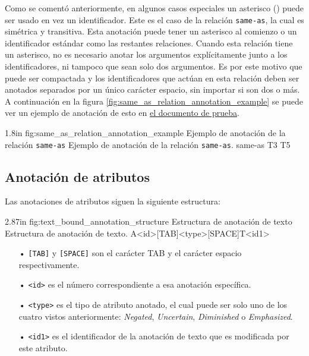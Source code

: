 Como se comentó anteriormente, en algunos casos especiales un asterisco (\doublequote{\,*\,}) puede ser usado en vez un identificador. Este es el caso de la relación \texttt{same-as}, la cual es simétrica y transitiva. Esta anotación puede tener un asterisco al comienzo o un identificador estándar como las restantes relaciones. Cuando esta relación tiene un asterisco, no es necesario anotar los argumentos explícitamente junto a los identificadores, ni tampoco que sean solo dos argumentos. Es por este motivo que puede ser compactada y los identificadores que actúan en esta relación deben ser anotados separados por un único carácter espacio, sin importar si son dos o más. A continuación en la figura \ref{fig:same_as_relation_annotation_example} se puede ver un ejemplo de anotación de esto en \hyperref[sentence:annotation_example]{el documento de prueba}.

\begin{annexample}
	[backgroundcolor=cyan!13]
	{1.8in}
	{fig:same_as_relation_annotation_example}
	{Ejemplo de anotación de la relación \texttt{same-as}}
	{Ejemplo de anotación de la relación \texttt{same-as}.}
	\textasteriskcentered\space\space\space same-as T3 T5
\end{annexample}

\subsection{Anotación de atributos}
Las anotaciones de atributos siguen la siguiente estructura:

\begin{annexample}
	[backgroundcolor=green!13]
	{2.87in}
	{fig:text_bound_annotation_structure}
	{Estructura de anotación de texto}
	{Estructura de anotación de texto.}
	A<id>[TAB]<type>[SPACE]T<id1>
\end{annexample}

\begin{itemize}
	\item[•] \texttt{[TAB]} y \texttt{[SPACE]} son el carácter TAB y el carácter espacio respectivamente.
	\vspace{-0.1in}
	\item[•] \texttt{<id>} es el número correspondiente a esa anotación específica.
	\vspace{-0.1in}
	\item[•] \texttt{<type>} es el tipo de atributo anotado, el cual puede ser solo uno de los cuatro vistos anteriormente: {\it Negated}, {\it Uncertain}, {\it Diminished} o {\it Emphasized}.
	\vspace{-0.1in}
	\item[•] \texttt{<id1>} es el identificador de la anotación de texto que es modificada por este atributo.
\end{itemize}

